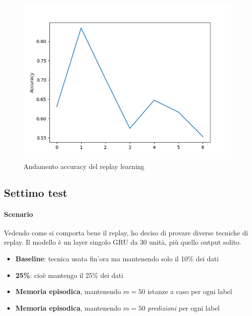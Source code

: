\documentclass[11pt, a4paper, twoside, openright]{book}
\begin{document}
\begin{figure}
    \centering
    \includegraphics[scale=0.5]{img/repl6.png}
    \caption{Andamento accuracy del replay learning}
    \label{fig:repl6}
\end{figure}
\subsection{Settimo test}
\paragraph{Scenario} Vedendo come si comporta bene il replay, ho deciso di provare diverse tecniche di replay. Il modello è un layer singolo GRU da 30 unità, più quello output solito.
\begin{itemize}
    \item[] \textbf{Baseline}: tecnica usata fin'ora ma mantenendo solo il 10\% dei dati
    \item[] \textbf{25\%}: cioè mantengo il 25\% dei dati
    \item[] \textbf{Memoria episodica}, mantenendo $m = 50$ istanze a caso per ogni label
    \item[] \textbf{Memoria episodica}, mantenendo $m = 50$ \textit{predizioni} per ogni label
\end{itemize}
\end{document}
